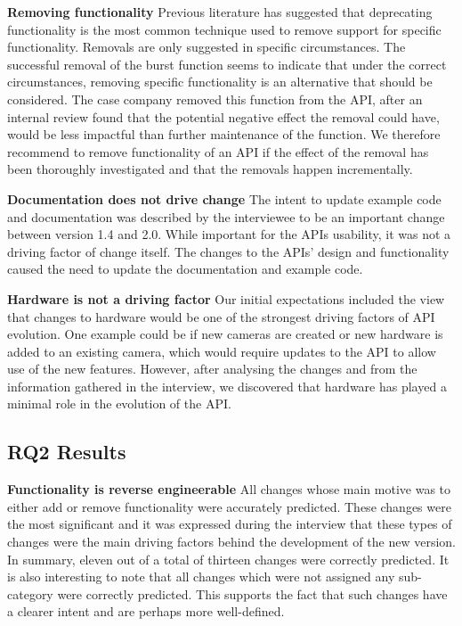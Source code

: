 \documentclass{sig-alternate}
\begin{document}
\smallskip \noindent
\textbf{Removing functionality  } %
Previous literature has suggested that deprecating functionality is the most common technique used to remove support for specific functionality. Removals are only suggested in specific circumstances. The successful removal of the burst function seems to indicate that under the correct circumstances, removing specific functionality is an alternative that should be considered. The case company removed this function from the API, after an internal review found that the potential negative effect the removal could have, would be less impactful than further maintenance of the function. We therefore recommend to remove functionality of an API if the effect of the removal has been thoroughly investigated and that the removals happen incrementally.

\smallskip \noindent
\textbf{Documentation does not drive change  } %
The intent to update example code and documentation was described by the interviewee to be an important change between version 1.4 and 2.0. While important for the APIs usability, it was not a driving factor of change itself. The changes to the APIs' design and functionality caused the need to update the documentation and example code.

\smallskip \noindent
\textbf{Hardware is not a driving factor  } %
Our initial expectations included the view that changes to hardware would be one of the strongest driving factors of API evolution. One example could be if new cameras are created or new hardware is added to an existing camera, which would require updates to the API to allow use of the new features. However, after analysing the changes and from the information gathered in the interview, we discovered that hardware has played a minimal role in the evolution of the API. 

\subsection{RQ2 Results}



\noindent
\textbf{Functionality is reverse engineerable  } %
All changes whose main motive was to either add or remove functionality were accurately predicted. These changes were the most significant and it was expressed during the interview that these types of changes were the main driving factors behind the development of the new version. In summary, eleven out of a total of thirteen changes were correctly predicted. It is also interesting to note that all changes which were not assigned any sub-category were correctly predicted. This supports the fact that such changes have a clearer intent and are perhaps more well-defined.
\end{document}
